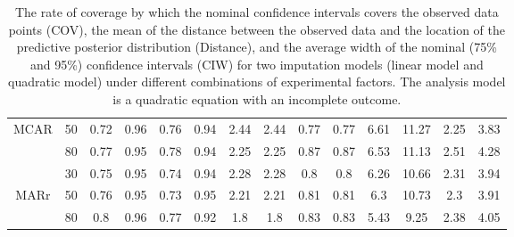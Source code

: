 \documentclass[12pt, fullpage, a4paper]{article}
\begin{document}
\begin{table}
\begin{tabular}{cc|cccc|cccc|cccc}
		\multicolumn{1}{c|}{MCAR} & 50                    & 0.72                       & 0.96                       & 0.76                       & 0.94                        & 2.44                       & 2.44                       & 0.77                       & 0.77                        & 6.61                       & 11.27                      & 2.25                       & 3.83                       \\
		\multicolumn{1}{c|}{}     & 80                    & 0.77                       & 0.95                       & 0.78                       & 0.94                        & 2.25                       & 2.25                       & 0.87                       & 0.87                        & 6.53                       & 11.13                      & 2.51                       & 4.28                       \\\hline
		\multicolumn{1}{c|}{}     & 30                    & 0.75                       & 0.95                       & 0.74                       & 0.94                        & 2.28                       & 2.28                       & 0.8                        & 0.8                         & 6.26                       & 10.66                      & 2.31                       & 3.94                       \\
		\multicolumn{1}{c|}{MARr} & 50                    & 0.76                       & 0.95                       & 0.73                       & 0.95                        & 2.21                       & 2.21                       & 0.81                       & 0.81                        & 6.3                        & 10.73                      & 2.3                        & 3.91                       \\
		\multicolumn{1}{c|}{}     & 80                    & 0.8                        & 0.96                       & 0.77                       & 0.92                        & 1.8                        & 1.8                        & 0.83                       & 0.83                        & 5.43                       & 9.25                       & 2.38                       & 4.05                      
	\end{tabular}
	\caption{The rate of coverage by which the nominal confidence intervals covers the observed data points (COV), the mean of the distance between the observed data and the location of the predictive posterior distribution (Distance), and the average width of the nominal (75\% and 95\%) confidence intervals (CIW) for two imputation models (linear model and quadratic model) under different combinations of experimental factors. The analysis model is a quadratic equation with an incomplete outcome.}
	\label{tab6_1}
\end{table}
\end{document}
